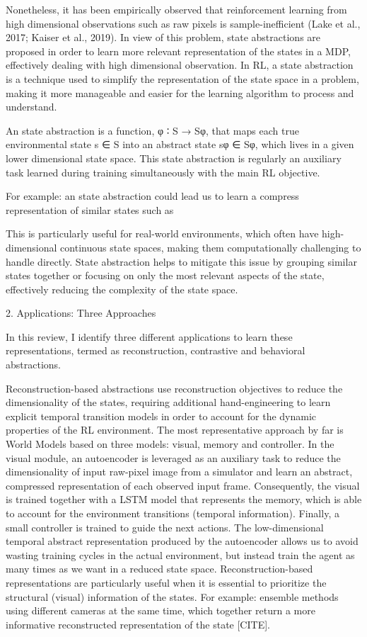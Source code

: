 Nonetheless, it has been empirically observed that reinforcement learning from high dimensional observations such as raw pixels is sample-inefficient (Lake et al., 2017; Kaiser et al., 2019). In view of this problem, state abstractions are proposed in order to learn more relevant representation of the states in a MDP, effectively dealing with high dimensional observation. In RL, a state abstraction is a technique used to simplify the representation of the state space in a problem, making it more manageable and easier for the learning algorithm to process and understand.

An state abstraction is a function, φ ∶ S → Sφ, that maps each true environmental state s ∈ S into an abstract state sφ ∈ Sφ, which lives in a given lower dimensional state space. This state abstraction is regularly an auxiliary task learned during training simultaneously with the main RL objective. 

For example: an state abstraction could lead us to learn a compress representation of similar states such as 


This is particularly useful for real-world environments, which often have high-dimensional continuous state spaces, making them computationally challenging to handle directly. State abstraction helps to mitigate this issue by grouping similar states together or focusing on only the most relevant aspects of the state, effectively reducing the complexity of the state space.

2. Applications: Three Approaches

In this review, I identify three different applications to learn these representations, termed as reconstruction, contrastive and behavioral abstractions.

Reconstruction-based abstractions use reconstruction objectives to reduce the dimensionality of the states, requiring additional hand-engineering to learn explicit temporal transition models in order to account for the dynamic properties of the RL environment. The most representative approach by far is World Models based on three models: visual, memory and controller. In the visual module, an autoencoder is leveraged as an auxiliary task to reduce the dimensionality of input raw-pixel image from a simulator and learn an abstract, compressed representation of each observed input frame. Consequently, the visual is trained together with a LSTM model that represents the memory, which is able to account for the environment transitions (temporal information). Finally, a small controller is trained to guide the next actions. The low-dimensional temporal abstract representation produced by the autoencoder allows us to avoid wasting training cycles in the actual environment, but instead train the agent as many times as we want in a reduced state space. Reconstruction-based representations are particularly useful when it is essential to prioritize the structural (visual) information of the states. For example: ensemble methods using different cameras at the same time, which together return a more informative reconstructed representation of the state [CITE].

